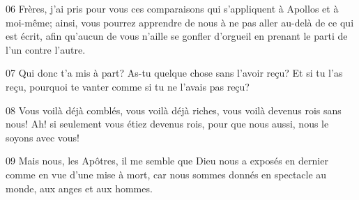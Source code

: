 
06 Frères, j’ai pris pour vous ces comparaisons qui s’appliquent à Apollos et à moi-même; ainsi, vous pourrez apprendre de nous à ne pas aller au-delà de ce qui est écrit, afin qu’aucun de vous n’aille se gonfler d’orgueil en prenant le parti de l’un contre l’autre.

07 Qui donc t’a mis à part? As-tu quelque chose sans l’avoir reçu? Et si tu l’as reçu, pourquoi te vanter comme si tu ne l’avais pas reçu?

08 Vous voilà déjà comblés, vous voilà déjà riches, vous voilà devenus rois sans nous! Ah! si seulement vous étiez devenus rois, pour que nous aussi, nous le soyons avec vous!

09 Mais nous, les Apôtres, il me semble que Dieu nous a exposés en dernier comme en vue d’une mise à mort, car nous sommes donnés en spectacle au monde, aux anges et aux hommes.
